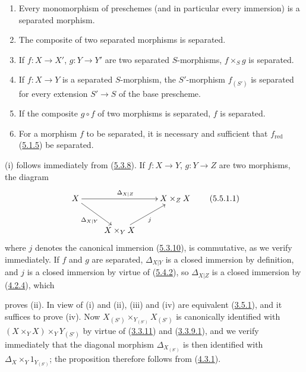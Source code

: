 \begin{proposition}[5.5.1]
\label{I.5.5.1}
\begin{enumerate}
  \item[\rm(i)] Every monomorphism of preschemes (and in particular every
    immersion) is a separated morphism.
  \item[\rm(ii)] The composite of two separated morphisms is separated.
  \item[\rm(iii)] If $f:X\to X'$, $g:Y\to Y'$ are two separated
    $S$-morphisms, $f\times_S g$ is separated.
  \item[\rm(iv)] If $f:X\to Y$ is a separated $S$-morphism, the
    $S'$-morphism $f_{(S')}$ is separated for every extension $S'\to S$ of the
    base prescheme.
  \item[\rm(v)] If the composite $g\circ f$ of two morphisms is separated, $f$
    is separated.
  \item[\rm(vi)] For a morphism $f$ to be separated, it is necessary and
    sufficient that $f_{\mathrm{red}}$ (\hyperref[I.5.1.5]{5.1.5}) be
    separated.
\end{enumerate}
\end{proposition}

(i) follows immediately from (\hyperref[I.5.3.8]{5.3.8}). If $f:X\to Y$,
$g:Y\to Z$ are two morphisms, the diagram
\[
  \xymatrix{
    X\ar[rr]^{\Delta_{X|Z}}\ar[dr]_{\Delta_{X|Y}} & &
    X\times_Z X\\
    & X\times_Y X\ar[ur]_j
  }
  \tag{5.5.1.1}\label{I.5.5.1.1}
\]
where $j$ denotes the canonical immersion (\hyperref[I.5.3.10]{5.3.10}), is
commutative, as we verify immediately. If $f$ and $g$ are separated,
$\Delta_{X|Y}$ is a closed immersion by definition, and $j$ is a
closed immersion by virtue of (\hyperref[I.5.4.2]{5.4.2}), so
$\Delta_{X|Z}$ is a closed immersion by
(\hyperref[I.4.2.4]{4.2.4}), which

proves (ii). In view of (i) and (ii), (iii) and (iv) are equivalent
(\hyperref[I.3.5.1]{3.5.1}), and it suffices to prove (iv). Now
$X_{(S')}\times_{Y_{(S')}}X_{(S')}$ is canonically identified with
$(X\times_Y X)\times_Y Y_{(S')}$ by virtue of
(\hyperref[I.3.3.11]{3.3.11}) and
(\hyperref[I.3.3.9.1]{3.3.9.1}), and we verify immediately that the
diagonal morphism $\Delta_{X_{(S')}}$ is then identified with
$\Delta_X\times_Y 1_{Y_{(S')}}$; the proposition therefore follows from
(\hyperref[I.4.3.1]{4.3.1}).

